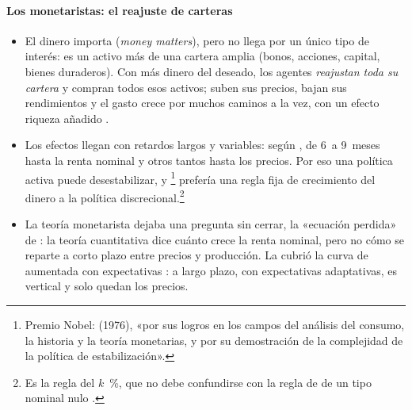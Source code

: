 \documentclass[11pt]{article}
\begin{document}
\paragraph{Los monetaristas: el reajuste de carteras}
\begin{itemize}
\item El dinero importa (\emph{money matters}), pero no llega por un único tipo de interés: es un activo más de una cartera amplia (bonos, acciones, capital, bienes duraderos). Con más dinero del deseado, los agentes \emph{reajustan toda su cartera} y compran todos esos activos; suben sus precios, bajan sus rendimientos y el gasto crece por muchos caminos a la vez, con un efecto riqueza añadido\nocite{BrunnerMeltzer1972Money} .
\item Los efectos llegan con retardos largos y variables: según \textcite{Friedman1970Counter}, de 6~a 9~meses hasta la renta nominal y otros tantos hasta los precios\nocite{Friedman1961Lag}. Por eso una política activa puede desestabilizar, y \footnote{Premio Nobel:  (1976), «por sus logros en los campos del análisis del consumo, la historia y la teoría monetarias, y por su demostración de la complejidad de la política de estabilización»\nocite{Nobel1976Friedman}.} prefería una regla fija de crecimiento del dinero a la política discrecional.\footnote{Es la regla del $k$~\%, que no debe confundirse con la regla de  de un tipo nominal nulo .}
\item La teoría monetarista dejaba una pregunta sin cerrar, la «ecuación perdida» de \textcite{Friedman1970Theoretical}: la teoría cuantitativa dice cuánto crece la renta nominal, pero no cómo se reparte a corto plazo entre precios y producción. La cubrió la curva de  aumentada con expectativas : a largo plazo, con expectativas adaptativas, es vertical y solo quedan los precios.
\end{itemize}
\end{document}
